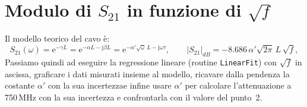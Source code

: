 \documentclass[11pt,a4paper,oneside]{book}
\begin{document}

\chapter{Modulo di \texorpdfstring{$S_{21}$}{S21} in funzione di \texorpdfstring{$\sqrt f$}{sqrt(f)}}
Il modello teorico del cavo è:
\begin{equation}
S_{21}(\omega) = \mathrm{e}^{-\gamma L} = \mathrm{e}^{-\alpha L-\mathrm{j}\beta L} = \mathrm{e}^{-\alpha'\sqrt\omega\,L-\mathrm{j}\omega\tau},
\qquad |S_{21}|_{dB} = -8.686\,\alpha'\sqrt{2\pi}\,L\,\sqrt f ,
\label{eq:modello}
\end{equation}
Passiamo quindi ad eseguire la regressione lineare (routine \texttt{LinearFit}) con $\sqrt f$ in ascissa, graficare i dati misurati insieme al modello,
   ricavare dalla pendenza la costante $\alpha'$ con la sua incertezzae infine 
   usare $\alpha'$ per calcolare l'attenuazione a 750\,MHz con la sua incertezza e 
   confrontarla con il valore del punto~2.
\end{document}
